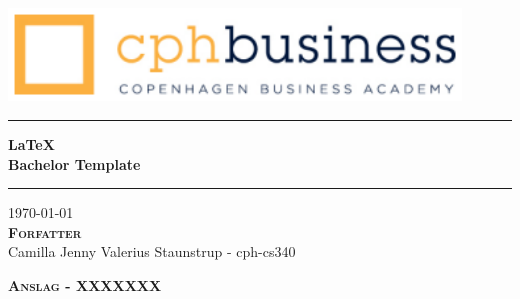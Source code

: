 
\begin{titlepage}
\begin{center}
\vspace{3cm}

\includegraphics[width=12cm]{./figures/cphlogo.png}
\vspace{6cm}

\hrule
\vspace{.5cm}
{ \huge \bfseries \LaTeX\\Bachelor Template} 
\vspace{.5cm}
\hrule

\vspace{1cm}
\centering \today\\ %
\vspace{1.5cm}
\textsc{\textbf{Forfatter}}\\
\vspace{.5cm}
\centering
Camilla Jenny Valerius Staunstrup - cph-cs340

\vspace{4cm}
\textsc{\textbf{Anslag - XXXXXXX}}\\

\end{center}
\end{titlepage}